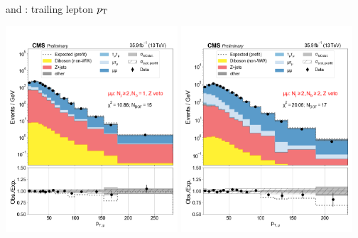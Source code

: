 \begin{frame}{}
\begin{columns}
\begin{tcolorbox}[colframe=NUpurple]{ \cee and \cmm: trailing lepton $p_{\mathrm{T}}$}
\begin{center}
                \includegraphics[width=0.48\textwidth]{chapters/Analysis/sectionStatisticalAnalysis/figures/fit/mumu_cat_gt2_eq1_b}
                \includegraphics[width=0.48\textwidth]{chapters/Analysis/sectionStatisticalAnalysis/figures/fit/mumu_cat_gt2_gt2_b}
            \end{center}
        \end{tcolorbox}{}


\end{columns}
\end{frame}
